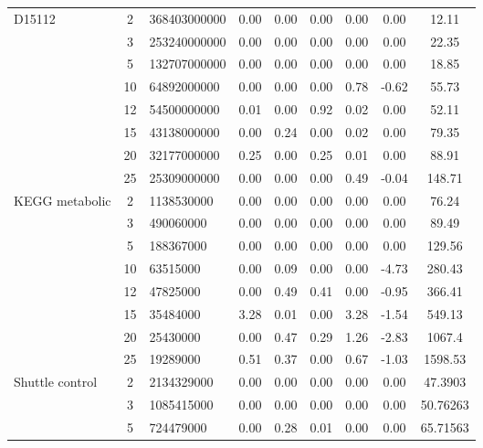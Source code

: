 {\begin{longtable}{@{}lclcccccc@{}}
D15112            & 2  & 368403000000     & 0.00    & 0.00    & 0.00   & 0.00 & 0.00    & 12.11     \\
                  & 3  & 253240000000     & 0.00    & 0.00    & 0.00   & 0.00 & 0.00    & 22.35     \\
                  & 5  & 132707000000     & 0.00    & 0.00    & 0.00   & 0.00 & 0.00    & 18.85     \\
                  & 10 & 64892000000      & 0.00    & 0.00    & 0.00   & 0.78 & -0.62   & 55.73     \\
                  & 12 & 54500000000      & 0.01    & 0.00    & 0.92   & 0.02 & 0.00    & 52.11     \\
                  & 15 & 43138000000      & 0.00    & 0.24    & 0.00   & 0.02 & 0.00    & 79.35     \\
                  & 20 & 32177000000      & 0.25    & 0.00    & 0.25   & 0.01 & 0.00    & 88.91     \\
                  & 25 & 25309000000      & 0.00    & 0.00    & 0.00   & 0.49 & -0.04   & 148.71    \\ \hline
KEGG metabolic    & 2  & 1138530000       & 0.00    & 0.00    & 0.00   & 0.00 & 0.00    & 76.24     \\
                  & 3  & 490060000        & 0.00    & 0.00    & 0.00   & 0.00 & 0.00    & 89.49     \\
                  & 5  & 188367000        & 0.00    & 0.00    & 0.00   & 0.00 & 0.00    & 129.56    \\
                  & 10 & 63515000         & 0.00    & 0.09    & 0.00   & 0.00 & -4.73   & 280.43    \\
                  & 12 & 47825000         & 0.00    & 0.49    & 0.41   & 0.00 & -0.95   & 366.41    \\
                  & 15 & 35484000         & 3.28    & 0.01    & 0.00   & 3.28 & -1.54   & 549.13    \\
                  & 20 & 25430000         & 0.00    & 0.47    & 0.29   & 1.26 & -2.83   & 1067.4    \\
                  & 25 & 19289000         & 0.51    & 0.37    & 0.00   & 0.67 & -1.03   & 1598.53   \\ \hline
Shuttle control   & 2  & 2134329000       & 0.00    & 0.00    & 0.00   & 0.00 & 0.00    & 47.3903   \\
                  & 3  & 1085415000       & 0.00    & 0.00    & 0.00   & 0.00 & 0.00    & 50.76263  \\
                  & 5  & 724479000        & 0.00    & 0.28    & 0.01   & 0.00 & 0.00    & 65.71563  \\

\end{longtable}}
